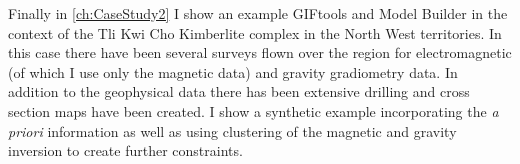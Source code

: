 Finally in \autoref{ch:CaseStudy2} I show an example GIFtools and Model Builder in the context of the Tli Kwi Cho Kimberlite complex in the North West territories. In this case there have been several surveys flown over the region for electromagnetic (of which I use only the magnetic data) and gravity gradiometry data. In addition to the geophysical data there has been extensive drilling and cross section maps have been created. I show a synthetic example incorporating the \emph{a priori} information as well as using clustering of the magnetic and gravity inversion to create further constraints.







\endinput

Interestingly, the assumption that all magnetizations are in the same direction also assumes that all Koenigsberger ratios are equal.

Any text after an \endinput is ignored.
You could put scraps here or things in progress.
